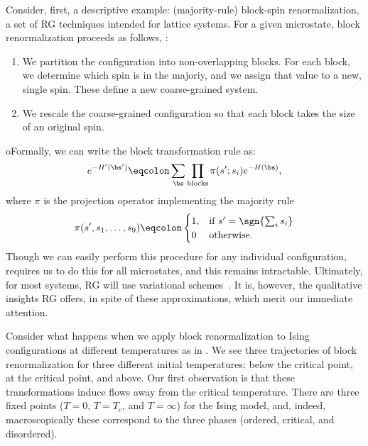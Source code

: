 Consider, first, a descriptive example: (majority-rule) block-spin
renormalization, a set of RG techniques intended for lattice
systems. For a given microstate, block renormalization proceeds as
follows, :%
\begin{enumerate}
\item We partition the configuration into non-overlapping blocks. For
  each block, we determine which spin is in the majoriy, and we assign
  that value to a new, single spin. These define a new coarse-grained
  system.
\item We rescale the coarse-grained configuration so that each block
  takes the size of an original spin.
\end{enumerate}
oFormally, we can write the block transformation rule as:%
\begin{equation}%
  e^{-H'(\bs')}\eqcolon\sum_{\bs} \prod_{\text{blocks}} \pi(s'; s_i)e^{-H(\bs)},\label{eq:block-rg-transformation}
\end{equation}%
where $\pi$ is the projection operator implementing the majority rule%
\begin{equation}%
  \pi(s',s_1,\ldots,s_9)\eqcolon
  \begin{cases}
    1,&\text{if } s'=\sgn{\sum_i s_i}\\
    0& \text{otherwise.}
  \end{cases}
\end{equation}%
Though we can easily perform this procedure for any individual
configuration,  requires us to do
this for all microstates, and this remains intractable. Ultimately,
for most systems, RG will use variational schemes~\cite{cardy}. It is,
however, the qualitative insights RG offers, in spite of these
approximations, which merit our immediate attention.

Consider what happens when we apply block renormalization to Ising
configurations at different temperatures as in
. We see three trajectories of block
renormalization for three different initial temperatures: below the
critical point, at the critical point, and above. Our first
observation is that these transformations induce flows away from the
critical temperature. There are three fixed points ($T=0$, $T=T_c$,
and $T=\infty$) for the Ising model, and, indeed, macroscopically
these correspond to the three phases (ordered, critical, and
disordered).

